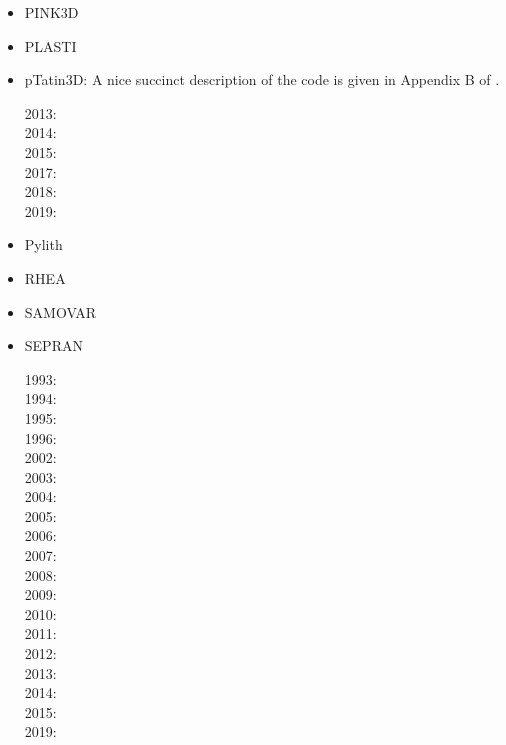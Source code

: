 \begin{itemize}
\item PINK3D
\cite{vosc15}


\item PLASTI
\cite{fuwb06}



\item pTatin3D: A nice succinct description of the code is given in Appendix B of \cite{lemh17}.

2013: \cite{phil13}\\
2014: \cite{mabl14}\\
2015: \cite{mabl15}\\
2017: \cite{lemh17}\\
2018: \cite{jolp18}\\
2019: \cite{jolm19}

\item Pylith

\cite{aakw13}


\item RHEA
\cite{bugg08}
\cite{stgb10}
\cite{algs12}
\cite{busa13}

\item SAMOVAR
\cite{egat10}

\item SEPRAN

1993: \cite{beky93}\cite{vavy93}\\
1994: \cite{vlvv94}\cite{vayv94}\\
1995: \cite{vayv95}\\
1996: \cite{vayu96}\\
2002: \cite{civv02}\cite{vavv02}\\
2003: \cite{vavs03}\\
2004: \cite{vavv04}\cite{vavv04b}\cite{vavv04c}\\
2005: \cite{vavv05}\cite{sepr05}\\
2006: \cite{liva06a}\cite{liva06b}\\
2007: \cite{vant07}\cite{civv07}\cite{brva07a}\cite{brva07b}\\
2008: \cite{plva08}\\
2009: \cite{vavl09}\\
2010: \cite{vahy10}\cite{syva10}\\
2011: \cite{vahs11}\\
2012: \cite{besy12}\cite{beva12}\cite{chgv12}\\
2013: \cite{ancv13}\\
2014: \cite{chsg14}\cite{mova14}\\
2015: \cite{vasy15}\\
2019: \cite{zhdv19}\cite{vayu19}


\end{itemize}
